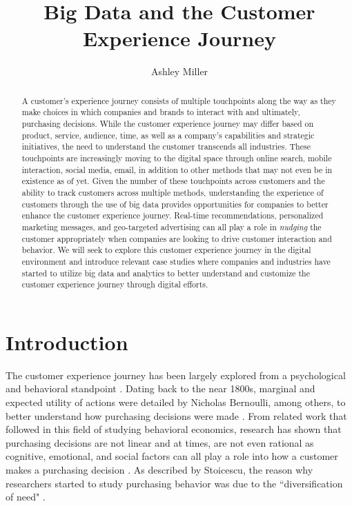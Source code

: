 \documentclass[sigconf]{acmart}
\begin{document}
\title{Big Data and the Customer Experience Journey}


\author{Ashley Miller}



\renewcommand{\shortauthors}{G. v. Laszewski}


\begin{abstract}
A customer's experience journey consists of multiple touchpoints along the way as they make choices in which companies and brands to interact with and ultimately, purchasing decisions. While the customer experience journey may differ based on product, service, audience, time, as well as a company's capabilities and strategic initiatives, the need to understand the customer transcends all industries. These touchpoints are increasingly moving to the digital space through online search, mobile interaction, social media, email, in addition to other methods that may not even be in existence as of yet. Given the number of these touchpoints across customers and the ability to track customers across multiple methods, understanding the experience of customers through the use of big data provides opportunities for companies to better enhance the customer experience journey. Real-time recommendations, personalized marketing messages, and geo-targeted advertising can all play a role in \textit{nudging} the customer appropriately when companies are looking to drive customer interaction and behavior. We will seek to explore this customer experience journey in the digital environment and introduce relevant case studies where companies and industries have started to utilize big data and analytics to better understand and customize the customer experience journey through digital efforts.
\end{abstract}


\maketitle
\section{Introduction}
The customer experience journey has been largely explored from a psychological and behavioral standpoint \cite{Stoicescu2015}. Dating back to the near 1800s, marginal and expected utility of actions were detailed by Nicholas Bernoulli, among others, to better understand how purchasing decisions were made \cite{Stoicescu2015}. From related work that followed in this field of studying behavioral economics, research has shown that purchasing decisions are not linear and at times, are not even rational as cognitive, emotional, and social factors can all play a role into how a customer makes a purchasing decision \cite{Stoicescu2015}. As described by Stoicescu, the reason why researchers started to study purchasing behavior was due to the ``diversification of need" \cite{Stoicescu2015}. 
\end{document}
